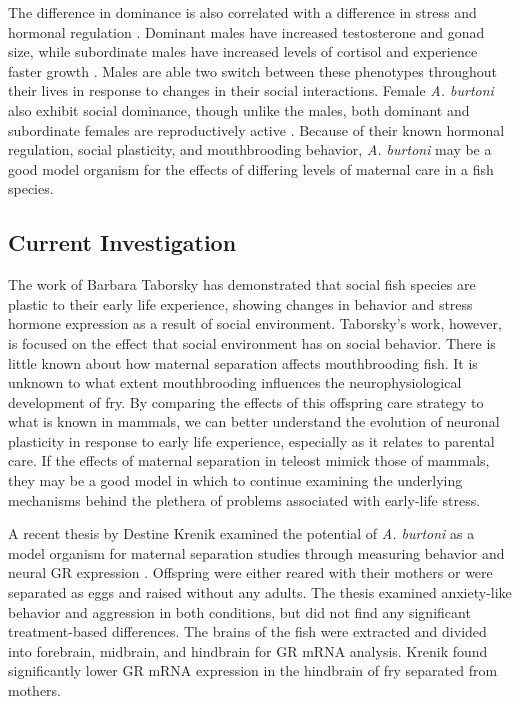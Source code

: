 \documentclass[12pt,twoside]{reedthesis}
\begin{document}
The difference in dominance is also correlated with a difference in stress and
hormonal regulation \citep{renn_fish_2008}. Dominant males have increased testosterone and gonad
size, while subordinate males have increased levels of
cortisol and experience faster growth \citep{francis_social_1993, renn_fish_2008}. Males are
able two switch between these phenotypes throughout their lives in response to
changes in their social interactions. Female \textit{A. burtoni} also exhibit social dominance, though unlike the
males, both dominant and subordinate females are reproductively active
\citep{renn_females_2012}. Because of their known hormonal regulation, social plasticity, and mouthbrooding
behavior, \textit{A. burtoni} may be a good model organism for the effects of
differing levels of maternal care in a fish species.

 
\subsection{Current Investigation}
 
The work of Barbara Taborsky has demonstrated that social fish species are
plastic to their early life experience, showing changes in behavior and stress
hormone expression as a result of social environment. Taborsky's work, however, is focused on the effect that social
environment has on social behavior. There is little known about how maternal
separation affects mouthbrooding fish. It is unknown to what extent
mouthbrooding influences the neurophysiological development of fry. By comparing
the effects of this offspring care strategy to what is known in mammals, we can
better understand the evolution of neuronal plasticity in response to early life
experience, especially as it relates to parental care. If the effects of
maternal separation in teleost mimick those of mammals, they may be a good model
in which to continue examining the underlying mechanisms behind the plethera of
problems associated with early-life stress.

A recent thesis by Destine Krenik examined the potential of \textit{A. burtoni}
as a model organism for maternal separation studies through measuring behavior and neural GR
expression \citep{KrenikDestine2018Teom}. Offspring were either reared with their mothers or were separated as
eggs and raised without any adults. The thesis examined anxiety-like behavior and aggression in both
conditions, but did not find any significant treatment-based differences. The
brains of the fish were extracted and divided into forebrain, midbrain, and hindbrain for
GR mRNA analysis. Krenik found significantly lower GR mRNA expression in
the hindbrain of fry separated from mothers.
\end{document}
